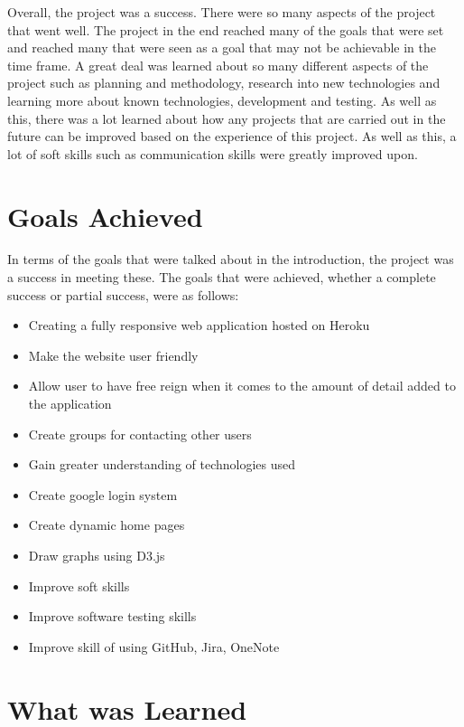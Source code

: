 Overall, the project was a success. There were so many aspects of the project that went well. The project in the end reached many of the goals that were set and reached many that were seen as a goal that may not be achievable in the time frame. A great deal was learned about so many different aspects of the project such as planning and methodology, research into new technologies and learning more about known technologies, development and testing. As well as this, there was a lot learned about how any projects that are carried out in the future can be improved based on the experience of this project. As well as this, a lot of soft skills such as communication skills were greatly improved upon. \\

\section{Goals Achieved}
In terms of the goals that were talked about in the introduction, the project was a success in meeting these.  The goals that were achieved, whether a complete success or partial success, were as follows:
\begin{itemize}
\item Creating a fully responsive web application hosted on Heroku
\item Make the website user friendly
\item Allow user to have free reign when it comes to the amount of detail added to the application
\item Create groups for contacting other users
\item Gain greater understanding of technologies used
\item Create google login system
\item Create dynamic home pages
\item Draw graphs using D3.js
\item Improve soft skills
\item Improve software testing skills
\item Improve skill of using GitHub, Jira, OneNote
\end{itemize}

\section{What was Learned}

